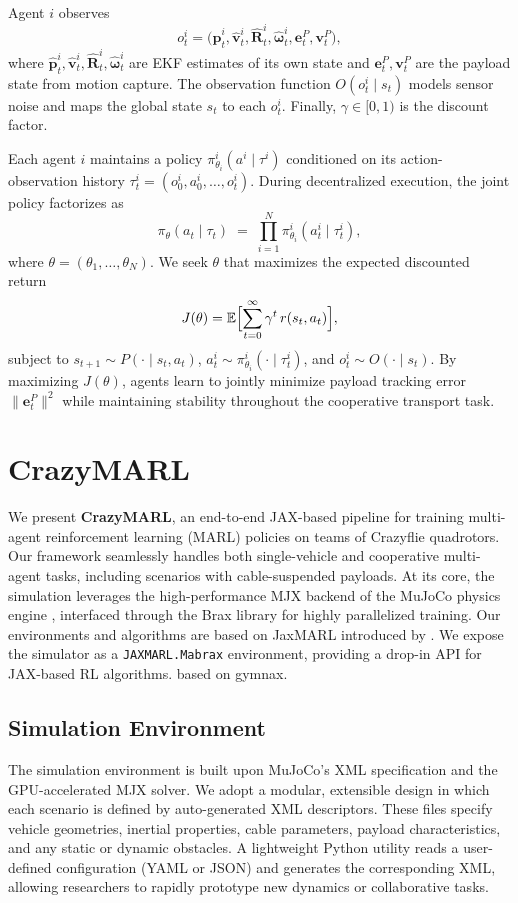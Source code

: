 Agent $i$ observes 
\[
o^i_t = \bigl(\hat{\mathbf{p}}^i_t,\hat{\mathbf{v}}^i_t,\hat{\mathbf{R}}^i_t,\hat{\boldsymbol{\omega}}^i_t,\mathbf{e}^P_t,\mathbf{v}^P_t\bigr),
\]
where $\hat{\mathbf{p}}^i_t,\hat{\mathbf{v}}^i_t,\hat{\mathbf{R}}^i_t,\hat{\boldsymbol{\omega}}^i_t$ are EKF estimates of its own state and $\mathbf{e}^P_t,\mathbf{v}^P_t$ are the payload state from motion capture. The observation function $O(o^i_t \mid s_t)$ models sensor noise and maps the global state $s_t$ to each $o^i_t$. Finally, $\gamma \in [0,1)$ is the discount factor.

Each agent $i$ maintains a policy $\pi^i_{\theta_i}(a^i \mid \tau^i)$ conditioned on its action-observation history $\tau^i_t = (o^i_0,a^i_0,\dots,o^i_t)$. During decentralized execution, the joint policy factorizes as
\[
\pi_\theta(a_t \mid \tau_t) \;=\; \prod_{i=1}^N \pi^i_{\theta_i}(a^i_t \mid \tau^i_t),
\]
where $\theta=(\theta_1,\dots,\theta_N)$. We seek $\theta$ that maximizes the expected discounted return
\[
J(\theta) = \mathbb{E}\Bigl[\sum_{t=0}^\infty \gamma^t\,r(s_t,a_t)\Bigr],
\]
subject to $s_{t+1}\sim P(\cdot\mid s_t,a_t)$, $a^i_t\sim \pi^i_{\theta_i}(\cdot\mid \tau^i_t)$, and $o^i_t\sim O(\cdot\mid s_t)$. By maximizing $J(\theta)$, agents learn to jointly minimize payload tracking error $\|\mathbf{e}^P_t\|^2$ while maintaining stability throughout the cooperative transport task.
\section{CrazyMARL}
We present \textbf{CrazyMARL}, an end-to-end JAX-based pipeline for training multi-agent reinforcement learning (MARL) policies on teams of Crazyflie quadrotors. Our framework seamlessly handles both single-vehicle and cooperative multi-agent tasks, including scenarios with cable-suspended payloads. At its core, the simulation leverages the high-performance MJX backend of the MuJoCo physics engine \cite{todorov_mujoco_2012}, interfaced through the Brax library for highly parallelized training. Our environments and algorithms are based on JaxMARL introduced by \autocite{flair2023jaxmarl}. We expose the simulator as a \texttt{JAXMARL.Mabrax} environment, providing a drop-in API for JAX-based RL algorithms.
\autocite{gymnax2022github} based on gymnax.
\subsection{Simulation Environment}
The simulation environment is built upon MuJoCo's XML specification and the GPU-accelerated MJX solver. We adopt a modular, extensible design in which each scenario is defined by auto-generated XML descriptors. These files specify vehicle geometries, inertial properties, cable parameters, payload characteristics, and any static or dynamic obstacles. A lightweight Python utility reads a user-defined configuration (YAML or JSON) and generates the corresponding XML, allowing researchers to rapidly prototype new dynamics or collaborative tasks. 




